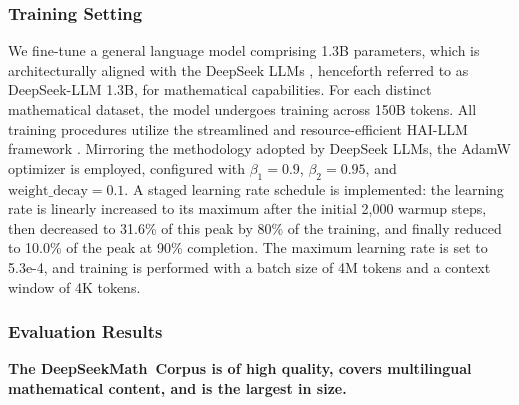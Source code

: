 \begin{itemize}[topsep=0pt]
\subsubsection{Training Setting}
\label{sec:quality-policy}
We fine-tune a general language model comprising 1.3B parameters, which is architecturally aligned with the DeepSeek LLMs \citep{deepseek-llm}, henceforth referred to as DeepSeek-LLM 1.3B, for mathematical capabilities. For each distinct mathematical dataset, the model undergoes training across 150B tokens. All training procedures utilize the streamlined and resource-efficient HAI-LLM framework \citep{haillm}. Mirroring the methodology adopted by DeepSeek LLMs, the AdamW optimizer \citep{adamW} is employed, configured with $\beta_1=0.9$, $\beta_2=0.95$, and $\mathrm{weight\_decay}=0.1$. A staged learning rate schedule is implemented: the learning rate is linearly increased to its maximum after the initial 2,000 warmup steps, then decreased to 31.6\% of this peak by 80\% of the training, and finally reduced to 10.0\% of the peak at 90\% completion. The maximum learning rate is set to 5.3e-4, and training is performed with a batch size of 4M tokens and a context window of 4K tokens.

\subsubsection{Evaluation Results}

\textbf{The DeepSeekMath~Corpus is of high quality, covers multilingual mathematical content, and is the largest in size.}


\end{itemize}
